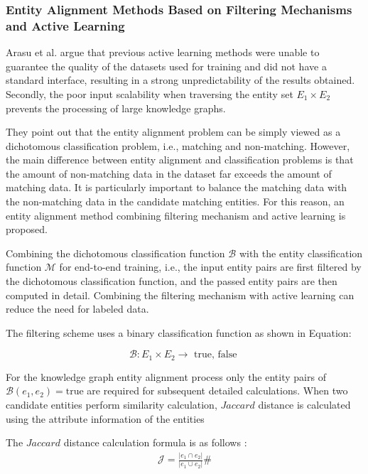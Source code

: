 \documentclass[sigconf]{acmart}
\begin{document}
{\subsubsection{Entity Alignment Methods Based on Filtering Mechanisms and Active Learning}

Arasu et al. \cite{arasu2010active} argue that previous active learning methods were unable to guarantee the quality of the datasets used for training and did not have a standard interface, resulting in a strong unpredictability of the results obtained. Secondly, the poor input scalability when traversing the entity set $E_1 \times E_2$ prevents the processing of large knowledge graphs.

They point out that the entity alignment problem can be simply viewed as a dichotomous classification problem, i.e., matching and non-matching. However, the main difference between entity alignment and classification problems is that the amount of non-matching data in the dataset far exceeds the amount of matching data. It is particularly important to balance the matching data with the non-matching data in the candidate matching entities. For this reason, an entity alignment method combining filtering mechanism and active learning is proposed.

Combining the dichotomous classification function $\mathcal{B}$ with the entity classification function $\mathcal{M}$  for end-to-end training, i.e., the input entity pairs are first filtered by the dichotomous classification function, and the passed entity pairs are then computed in detail. Combining the filtering mechanism with active learning can reduce the need for labeled data.

The filtering scheme uses a binary classification function as shown in Equation:

\begin{equation}
     \mathcal{B}: E_{1} \times E_{2} \rightarrow \text { true, false }
\end{equation}

For the knowledge graph entity alignment process only the entity pairs of $\mathcal{B}(e_1,e_2) = \text{true}$ are required for subsequent detailed calculations. When two candidate entities perform similarity calculation, $Jaccard$ distance is calculated using the attribute information of the entities

The $Jaccard$ distance calculation formula is as follows :
\begin{equation}
    \begin{array}{c}
         \mathcal{J}=\frac{\left|e_{1} \cap e_{2}\right|}{\left|e_{1} \cup e_{2}\right|} \# 
    \end{array}
\end{equation}

}
\end{document}
